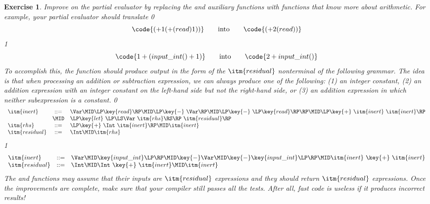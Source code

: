 \documentclass[7x10]{TimesAPriori_MIT}%
\def\racketEd{0}
\def\pythonEd{1}
\providecommand{\BookEdition}{1}
\let\edition\BookEdition
\newcommand{\pythonColor}[0]{}
\newtheorem{exercise}[theorem]{Exercise}
\numberwithin{theorem}{chapter}
\numberwithin{definition}{chapter}
\numberwithin{equation}{chapter}
\begin{document}
\begin{exercise}
\normalfont\normalsize

Improve on the partial evaluator by replacing the  and
 auxiliary functions with functions that know more about
arithmetic. For example, your partial evaluator should translate
{\if\edition\racketEd
\[
\code{(+ 1 (+ (read) 1))} \qquad \text{into} \qquad
\code{(+ 2 (read))}
\]
\fi}
{\if\edition\pythonEd\pythonColor
\[
\code{1 + (input\_int() + 1)} \qquad \text{into} \qquad
\code{2 + input\_int()}
\]
\fi}
%
To accomplish this, the  function should produce output
in the form of the $\itm{residual}$ nonterminal of the following
grammar. The idea is that when processing an addition or subtraction
expression, we can always produce one of the following: (1) an integer
constant, (2) an addition expression with an integer constant on the
left-hand side but not the right-hand side, or (3) an addition
expression in which neither subexpression is a constant.
%
{\if\edition\racketEd
\[
\begin{array}{lcl}
  \itm{inert} &::=& \Var
    \MID \LP\key{read}\RP
    \MID \LP\key{-} ~\Var\RP
    \MID \LP\key{-} ~\LP\key{read}\RP\RP
    \MID \LP\key{+} ~ \itm{inert} ~ \itm{inert}\RP\\
    &\MID& \LP\key{let}~\LP\LS\Var~\itm{rhs}\RS\RP~ \itm{residual} \RP \\  
  \itm{rhs} &::=& \LP\key{+}~ \Int~ \itm{inert}\RP
    \MID \itm{inert} \\
  \itm{residual} &::=& \Int \MID \itm{rhs} 
\end{array}
\]
\fi}
{\if\edition\pythonEd\pythonColor
\[
\begin{array}{lcl}
  \itm{inert} &::=& \Var
    \MID \key{input\_int}\LP\RP
    \MID \key{-} \Var
    \MID \key{-} \key{input\_int}\LP\RP
    \MID \itm{inert} ~ \key{+} ~ \itm{inert}\\
  \itm{residual} &::=& \Int
    \MID \Int ~ \key{+} ~ \itm{inert}
    \MID \itm{inert} 
\end{array}
\]
\fi}
The  and  functions may assume that their
inputs are $\itm{residual}$ expressions and they should return
$\itm{residual}$ expressions.  Once the improvements are complete,
make sure that your compiler still passes all the tests.  After
all, fast code is useless if it produces incorrect results!
\end{exercise}
\end{document}
